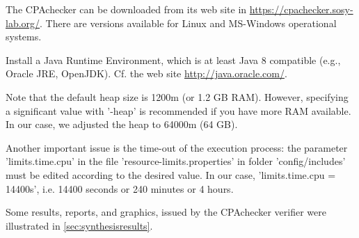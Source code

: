 The CPAchecker can be downloaded from its web site in \url{https://cpachecker.sosy-lab.org/}. There are versions available for Linux and MS-Windows operational systems.

Install a Java Runtime Environment, which is at least Java 8 compatible (e.g., Oracle JRE, OpenJDK). Cf. the web site \url{http://java.oracle.com/}.

\bigskip
{} 
\bigskip

Note that the default heap size is 1200m (or 1.2 GB RAM). However, specifying a significant value with '-heap' is recommended if you have more RAM available. In our case, we adjusted the heap to 64000m (64 GB). 

Another important issue is the time-out of the execution process: the parameter 'limits.time.cpu' in the file 'resource-limits.properties' in folder 'config/includes' must be edited according to the desired value. In our case, 'limits.time.cpu = 14400s', i.e. 14400 seconds or 240 minutes or 4 hours.

Some results, reports, and graphics, issued by the CPAchecker verifier were illustrated in \ref{sec:synthesisresults}.

